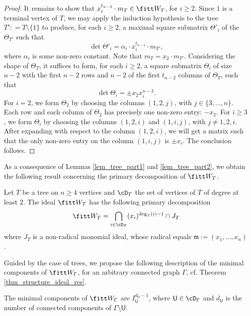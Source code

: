 \documentclass[10pt, leqno]{amsart}
\begin{document}
\begin{proof}
It remains to show that $x_i^{t_{n-3}} \cdot m_T \in \fitt W_T$, for $i \ge 2$. Since $1$ is a terminal vertex of $T$, we may apply the induction hypothesis to the tree $T': = T \setminus \{1\}$ to produce, for each $i \ge 2$, a maximal square submatrix $\Theta'_i$ of the $\Theta_{T'}$ such that
\[
\det \Theta'_i = \alpha_i \cdot x_i^{t_{n-4}} \cdot m_{T'},
\]
where $\alpha_i$ is some non-zero constant. Note that $m_T = x_2 \cdot m_{T'}$. Considering the shape of $\Theta_T$, it suffices to form, for each $i \ge 2$, a square submatrix $\Theta_i$ of size $n - 2$ with the first $n - 2$ rows and $n - 2$ of the first $t_{n-2}$ columns of $\Theta_T$, such that
\[
\det \Theta_i = \pm x_2 x_i^{n-3}.
\]
For $i = 2$, we form $\Theta_2$ by choosing the columns $(1,2,j)$, with $j\in \{3, \ldots, n\}$. Each row and each column of $\Theta_2$ has precisely one non-zero entry: $-x_2$. For  $i \ge 3$, we form $\Theta_i$ by choosing the columns $(1,2,i)$ and $(1,i,j)$, with $j\neq 1,2,i$. After expanding with respect to the column $(1,2,i)$, we will get a matrix such that the only non-zero entry on the column $(1,i,j)$ is $\pm x_i$. The conclusion follows.
\end{proof}

As a consequence of Lemmas \ref{lem_tree_part1} and \ref{lem_tree_part2}, we obtain the following result concerning the primary decomposition of $\fitt W_T$.

\begin{thm} \label{thm_primary_decomp_trees}
Let $T$ be a tree on $n \ge 4$ vertices and $\cD_T$ the set of vertices of $T$ of degree at least $2$. The ideal $\fitt W_T$ has the following primary decomposition
\[
\fitt W_T = \bigcap_{i \in \cD_T} (x_i)^{\deg_T(i)-1} \cap J_T
\]
where $J_T$ is a non-radical monomial ideal, whose radical equals $\mathfrak{m}:=(x_1, \ldots, x_n)$.
\end{thm}


Guided by the case of trees, we propose the following description of the minimal components of $\fitt W_\Gamma$, for an arbitrary connected graph $\Gamma$, cf. Theorem \ref{thm_structure_ideal_res}.

\begin{conj} \label{conj_minimal components}
The minimal components of $\fitt W_\Gamma$ are $I_\mathsf{U}^{d_\mathsf{U} - 1}$, where $\mathsf{U} \in \cD_\Gamma$ and $d_{\mathsf{U}}$ is the number of connected components of $\Gamma \setminus \mathsf{U}$.
\end{conj}
\end{document}
